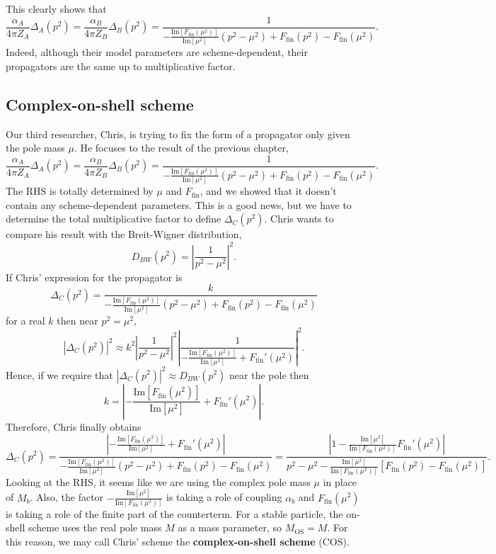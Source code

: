 \documentclass[11pt]{article}
\theoremstyle{definition}
\theoremstyle{remark}
\begin{document}
	This clearly shows that
	\[\frac{\alpha_{A}}{4\pi Z_{A}}\Delta_{A}(p^{2})=\frac{\alpha_{B}}{4\pi Z_{B}}\Delta_{B}(p^{2})=\frac{1}{-\frac{\mathrm{Im}[F_{\text{fin}}(\mu^{2})]}{\mathrm{Im}[\mu^{2}]}(p^{2}-\mu^{2})+F_{\text{fin}}(p^{2})-F_{\text{fin}}(\mu^{2})}.\]
	Indeed, although their model parameters are scheme-dependent, their propagators are the same up to multiplicative factor.
	
	\subsection{Complex-on-shell scheme}
	Our third researcher, Chris, is trying to fix the form of a propagator only given the pole mass $\mu$.
	He focuses to the result of the previous chapter,
	\[\frac{\alpha_{A}}{4\pi Z_{A}}\Delta_{A}(p^{2})=\frac{\alpha_{B}}{4\pi Z_{B}}\Delta_{B}(p^{2})=\frac{1}{-\frac{\mathrm{Im}[F_{\text{fin}}(\mu^{2})]}{\mathrm{Im}[\mu^{2}]}(p^{2}-\mu^{2})+F_{\text{fin}}(p^{2})-F_{\text{fin}}(\mu^{2})}.\]
	The RHS is totally determined by $\mu$ and $F_{\text{fin}}$, and we showed that it doesn't contain any scheme-dependent parameters.
	This is a good news, but we have to determine the total multiplicative factor to define $\Delta_{C}(p^{2})$.
	Chris wants to compare his result with the Breit-Wigner distribution,
	\[D_{BW}(p^{2})=\left|\frac{1}{p^{2}-\mu^{2}}\right|^{2}.\]
	If Chris' expression for the propagator is
	\[\Delta_{C}(p^{2})=\frac{k}{-\frac{\mathrm{Im}[F_{\text{fin}}(\mu^{2})]}{\mathrm{Im}[\mu^{2}]}(p^{2}-\mu^{2})+F_{\text{fin}}(p^{2})-F_{\text{fin}}(\mu^{2})}\]
	for a real $k$ then near $p^{2}=\mu^{2}$,
	\[|\Delta_{C}(p^{2})|^{2}\approx k^{2}\left|\frac{1}{p^{2}-\mu^{2}}\right|^{2}\left|\frac{1}{-\frac{\mathrm{Im}[F_{\text{fin}}(\mu^{2})]}{\mathrm{Im}[\mu^{2}]}+F_{\text{fin}}'(\mu^{2})}\right|^{2}.\]
	Hence, if we require that $|\Delta_{C}(p^{2})|^{2}\approx D_{BW}(p^{2})$ near the pole then
	\[k=\left|-\frac{\mathrm{Im}[F_{\text{fin}}(\mu^{2})]}{\mathrm{Im}[\mu^{2}]}+F_{\text{fin}}'(\mu^{2})\right|.\]
	Therefore, Chris finally obtains
	\[\Delta_{C}(p^{2})=\frac{\left|-\frac{\mathrm{Im}[F_{\text{fin}}(\mu^{2})]}{\mathrm{Im}[\mu^{2}]}+F_{\text{fin}}'(\mu^{2})\right|}{-\frac{\mathrm{Im}[F_{\text{fin}}(\mu^{2})]}{\mathrm{Im}[\mu^{2}]}(p^{2}-\mu^{2})+F_{\text{fin}}(p^{2})-F_{\text{fin}}(\mu^{2})}=\frac{\left|1-\frac{\mathrm{Im}[\mu^{2}]}{\mathrm{Im}[F_{\text{fin}}(\mu^{2})]}F_{\text{fin}}'(\mu^{2})\right|}{p^{2}-\mu^{2}-\frac{\mathrm{Im}[\mu^{2}]}{\mathrm{Im}[F_{\text{fin}}(\mu^{2})]}[F_{\text{fin}}(p^{2})-F_{\text{fin}}(\mu^{2})]}.\]
	Looking at the RHS, it seems like we are using the complex pole mass $\mu$ in place of $M_{b}$.
	Also, the factor $-\frac{\mathrm{Im}[\mu^{2}]}{\mathrm{Im}[F_{\text{fin}}(\mu^{2})]}$ is taking a role of coupling $\alpha_{b}$ and $F_{\text{fin}}(\mu^{2})$ is taking a role of the finite part of the counterterm.
	For a stable particle, the on-shell scheme uses the real pole mass $M$ as a mass parameter, so $M_{\mathrm{OS}}=M$.
	For this reason, we may call Chris' scheme the \textbf{complex-on-shell scheme} ($\mathrm{COS}$).
	
\end{document}
